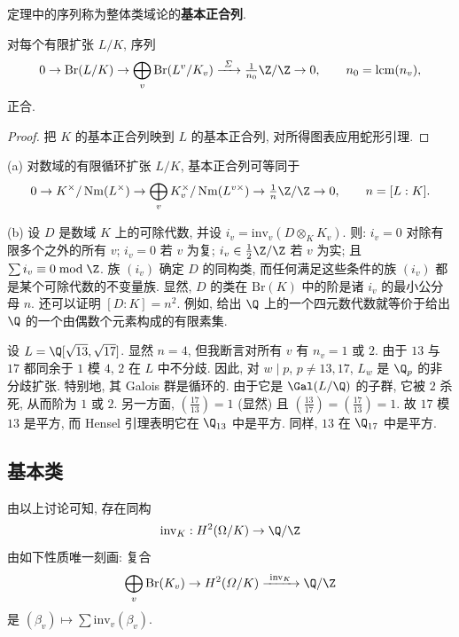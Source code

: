 定理中的序列称为整体类域论的\textbf{基本正合列}.

\begin{corollary}\label{cor:viii.4.3}
对每个有限扩张 $L/K$, 序列
\[
0\to\mathrm{Br}(L/K)\to\bigoplus_{v}\mathrm{Br}(L^{v}/K_{v})\xrightarrow{\ \varSigma\ }\tfrac{1}{n_{0}}\Z/\Z\to0,\qquad n_{0}=\mathrm{lcm}(n_{v}),
\]
正合.
\end{corollary}

\begin{proof}
把 $K$ 的基本正合列映到 $L$ 的基本正合列, 对所得图表应用蛇形引理.
\end{proof}

\begin{example}\label{ex:viii.4.4}
(a) 对数域的有限循环扩张 $L/K$, 基本正合列可等同于
\[
0\to K^{\times}/\Nm(L^{\times})\to\bigoplus_{v}K_{v}^{\times}/\Nm(L^{v\times})\to\tfrac{1}{n}\Z/\Z\to0,\qquad n=[L:K].
\]

(b) 设 $D$ 是数域 $K$ 上的可除代数, 并设 $i_v=\mathrm{inv}_v(D\otimes_K K_v)$. 则: $i_v=0$ 对除有限多个之外的所有 $v$; $i_v=0$ 若 $v$ 为复; $i_v\in\frac{1}{2}\Z/\Z$ 若 $v$ 为实; 且 $\sum i_v\equiv 0 \bmod \Z$. 族 $(i_v)$ 确定 $D$ 的同构类, 而任何满足这些条件的族 $(i_v)$ 都是某个可除代数的不变量族. 显然, $D$ 的类在 $\mathrm{Br}(K)$ 中的阶是诸 $i_v$ 的最小公分母 $n$. 还可以证明 $[D:K]=n^{2}$. 例如, 给出 $\Q$ 上的一个四元数代数就等价于给出 $\Q$ 的一个由偶数个元素构成的有限素集.
\end{example}

\begin{example}\label{ex:viii.4.5}
设 $L=\Q[\sqrt{13},\sqrt{17}]$. 显然 $n=4$, 但我断言对所有 $v$ 有 $n_v=1$ 或 $2$. 由于 $13$ 与 $17$ 都同余于 $1$ 模 $4$, $2$ 在 $L$ 中不分歧. 因此, 对 $w\mid p$, $p\ne 13,17$, $L_w$ 是 $\Q_p$ 的非分歧扩张. 特别地, 其 Galois 群是循环的. 由于它是 $\Gal(L/\Q)$ 的子群, 它被 $2$ 杀死, 从而阶为 $1$ 或 $2$. 另一方面, $\left(\frac{17}{13}\right)=1$ (显然) 且 $\left(\frac{13}{17}\right)=\left(\frac{17}{13}\right)=1$. 故 $17$ 模 $13$ 是平方, 而 Hensel 引理表明它在 $\Q_{13}$ 中是平方. 同样, $13$ 在 $\Q_{17}$ 中是平方.
\end{example}

\subsection*{基本类}

由以上讨论可知, 存在同构
\[
\mathrm{inv}_{K}:H^{2}(\Omega/K)\to\Q/\Z
\]
由如下性质唯一刻画: 复合
\[
\bigoplus_{v}\mathrm{Br}(K_{v})\to H^{2}(\varOmega/K)\xrightarrow{\ \mathrm{inv}_{K}\ }\Q/\Z
\]
是 $(\beta_{v})\mapsto\sum\mathrm{inv}_{v}(\beta_{v})$.

